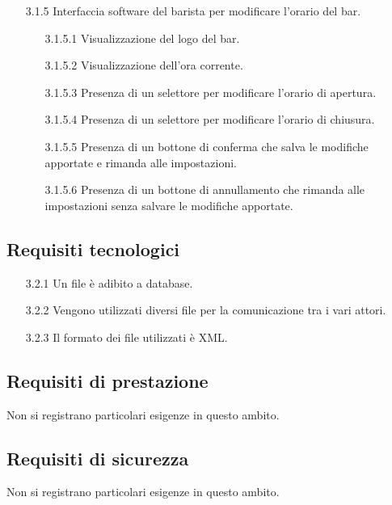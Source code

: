 \documentclass[a4paper,11pt]{article}       %
\begin{document}
\begin{itemize}
            \item[3.1.5] Interfaccia software del barista per modificare l'orario del bar.
                \begin{itemize}
                    \item[3.1.5.1] Visualizzazione del logo del bar.
                    \item[3.1.5.2] Visualizzazione dell'ora corrente.
                    \item[3.1.5.3] Presenza di un selettore per modificare l'orario di apertura.
                    \item[3.1.5.4] Presenza di un selettore per modificare l'orario di chiusura.
                    \item[3.1.5.5] Presenza di un bottone di conferma che salva le modifiche apportate e rimanda alle impostazioni.
                    \item[3.1.5.6] Presenza di un bottone di annullamento che rimanda alle impostazioni senza salvare le modifiche apportate.
                \end{itemize}
            
        \end{itemize}
        
    \subsection{Requisiti tecnologici}
        \begin{itemize}
            \item[3.2.1] Un file è adibito a \gls{database}.
            \item[3.2.2] Vengono utilizzati diversi file per la comunicazione tra i vari attori.
            \item[3.2.3] Il formato dei file utilizzati è \gls{XML}.
        \end{itemize}
    
    \subsection{Requisiti di prestazione}
    Non si registrano particolari esigenze in questo ambito.
    
    \subsection{Requisiti di sicurezza}
    Non si registrano particolari esigenze in questo ambito.
    
\end{document}
